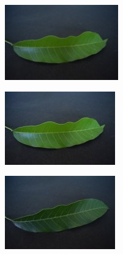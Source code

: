 \documentclass[twocolumn]{article}
\begin{document}
\begin{figure}[H]
    \begin{subfigure}[b]{0.30\columnwidth}
        \includegraphics[width=\textwidth]{mango4}
    \end{subfigure}
    \hfill
    \begin{subfigure}[b]{0.30\columnwidth}
        \includegraphics[width=\textwidth]{mango5}
    \end{subfigure}
    \hfill
    \begin{subfigure}[b]{0.30\columnwidth}
        \includegraphics[width=\textwidth]{mango6}
    \end{subfigure}
    \vspace{0.5em}
    

\end{figure}
\end{document}

